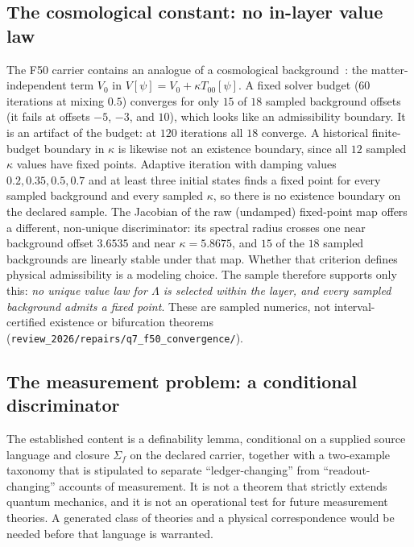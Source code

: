 \documentclass[11pt]{article}
\theoremstyle{definition}
\begin{document}
\subsection{The cosmological constant: no in-layer value law}\label{the-cosmological-constant-no-in-layer-value-law}

The F50 carrier contains an analogue of a cosmological background~\citep{Weinberg1989}: the matter-independent term
\(V_0\) in \(V[\psi]=V_0+\kappa T_{00}[\psi]\). A fixed solver budget (\(60\) iterations at mixing \(0.5\)) converges for
only \(15\) of \(18\) sampled background offsets (it fails at offsets \(-5\), \(-3\), and \(10\)), which looks like an
admissibility boundary. It is an artifact of the budget: at \(120\) iterations all \(18\) converge. A historical
finite-budget boundary in \(\kappa\) is likewise not an existence boundary, since all \(12\) sampled \(\kappa\) values have
fixed points. Adaptive iteration with damping values \(0.2,0.35,0.5,0.7\) and at least three initial states finds a fixed point
for every sampled background and every sampled \(\kappa\), so there is no existence boundary on the declared sample. The
Jacobian of the raw (undamped) fixed-point map offers a different, non-unique discriminator: its spectral radius crosses
one near background offset \(3.6535\) and near \(\kappa=5.8675\), and \(15\) of the \(18\) sampled backgrounds are linearly
stable under that map. Whether that criterion defines physical admissibility is a modeling
choice. The sample therefore supports only this: \emph{no unique value law for \(\Lambda\) is selected within the layer,
and every sampled background admits a fixed point}. These are sampled numerics, not interval-certified existence or
bifurcation theorems (\nolinkurl{review_2026/repairs/q7_f50_convergence/}).

\subsection{The measurement problem: a conditional discriminator}\label{the-measurement-problem-a-structural-discriminator}

The established content is a definability lemma, conditional on a supplied source language and closure
\(\Sigma_f\) on the declared carrier, together with a two-example taxonomy that is stipulated to separate
``ledger-changing'' from ``readout-changing'' accounts of measurement. It is not a theorem that strictly extends
quantum mechanics, and it is not an operational test for future measurement theories. A generated class of theories
and a physical correspondence would be needed before that language is warranted.
\end{document}
